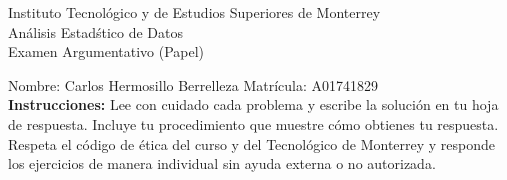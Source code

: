 \documentclass[10pt]{report}
\begin{document}
\newpage



\begin{center}
{\large Instituto Tecnol\'{o}gico y de Estudios Superiores de Monterrey \\
An\'alisis Estad\'stico de Datos } \\
Examen Argumentativo (Papel)
\end{center}

Nombre: \underline{\hspace*{.2in}}
Carlos Hermosillo Berrelleza
\underline{\hspace*{.2in}} \quad Matr\'icula:\underline{\hspace*{.2in}}
A01741829
\underline{\hspace*{.2in}} \\

{\bf Instrucciones:} Lee con cuidado cada problema y escribe la soluci\'on
en tu hoja de respuesta. Incluye tu procedimiento que muestre c\'omo obtienes tu respuesta.  Respeta el c\'odigo de \'etica del curso y del Tecnol\'ogico de Monterrey y responde los ejercicios de manera individual sin ayuda externa o no autorizada.
\end{document}

